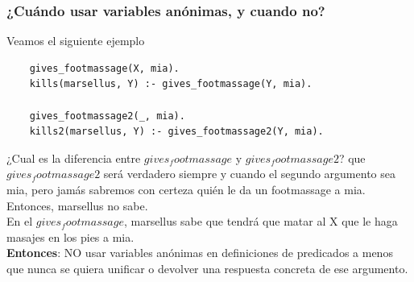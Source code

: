 \documentclass[10pt,a4paper]{article}
\begin{document}
\subsubsection*{¿Cuándo usar variables anónimas, y cuando no?}
Veamos el siguiente ejemplo 
\begin{lstlisting}
    gives_footmassage(X, mia).
    kills(marsellus, Y) :- gives_footmassage(Y, mia).

    gives_footmassage2(_, mia).
    kills2(marsellus, Y) :- gives_footmassage2(Y, mia).
\end{lstlisting}
¿Cual es la diferencia entre $gives_footmassage$ y $gives_footmassage2$? que $gives_footmassage2$ será verdadero siempre y cuando el segundo argumento sea mia, pero jamás sabremos con certeza quién le da un footmassage a mia. Entonces, marsellus no sabe. \\
En el $gives_footmassage$, marsellus sabe que tendrá que matar al X que le haga masajes en los pies a mia. \\
\textbf{Entonces}: NO usar variables anónimas en definiciones de predicados a menos que nunca se quiera unificar o devolver una respuesta concreta de ese argumento. 
\end{document}

